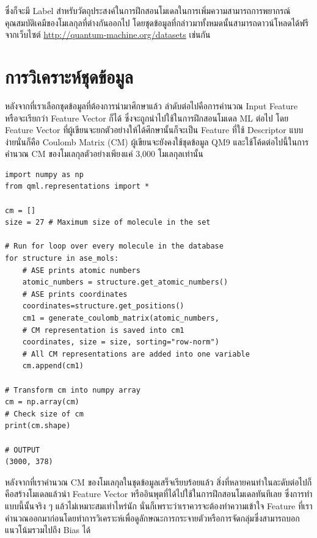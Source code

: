 \noindent ซึ่งก็จะมี Label สำหรับวัตถุประสงค์ในการฝึกสอนโมเดลในการเพิ่มความสามารถการพยากรณ์คุณสมบัติเคมีของโมเลกุลที่ต่างกันออกไป 
โดยชุดข้อมูลที่กล่าวมาทั้งหมดนั้นสามารถดาวน์โหลดได้ฟรีจากเว็บไซต์ \url{http://quantum-machine.org/datasets} เช่นกัน

\section{การวิเคราะห์ชุดข้อมูล}
\label{sec:dataset_analysis}

หลังจากที่เราเลือกชุดข้อมูลที่ต้องการนำมาศึกษาแล้ว ลำดับต่อไปคือการคำนวณ Input Feature หรือจะเรียกว่า Feature Vector ก็ได้
ซึ่งจะถูกนำไปใช้ในการฝึกสอนโมเดล ML ต่อไป โดย Feature Vector ที่ผู้เขียนจะยกตัวอย่างให้ได้ศึกษานั้นก็จะเป็น Feature ที่ใช้ Descriptor 
แบบง่ายนั่นก็คือ Coulomb Matrix (CM) ผู้เขียนจะยังคงใช้ชุดข้อมูล QM9 และใช้โค้ดต่อไปนี้ในการคำนวณ CM ของโมเลกุลตัวอย่างเพียงแค่ 3,000 
โมเลกุลเท่านั้น

\begin{lstlisting}[style=MyPython]
import numpy as np
from qml.representations import * 

cm = []
size = 27 # Maximum size of molecule in the set

# Run for loop over every molecule in the database
for structure in ase_mols: 
    # ASE prints atomic numbers 
    atomic_numbers = structure.get_atomic_numbers() 
    # ASE prints coordinates
    coordinates=structure.get_positions() 
    cm1 = generate_coulomb_matrix(atomic_numbers,
    # CM representation is saved into cm1
    coordinates, size = size, sorting="row-norm") 
    # All CM representations are added into one variable
    cm.append(cm1) 

# Transform cm into numpy array
cm = np.array(cm) 
# Check size of cm
print(cm.shape)

# OUTPUT
(3000, 378)
\end{lstlisting}

หลังจากที่เราคำนวณ CM ของโมเลกุลในชุดข้อมูลเสร็จเรียบร้อยแล้ว สิ่งที่หลายคนทำในละดับต่อไปก็คือสร้างโมเดลแล้วนำ Feature Vector 
หรืออินพุตที่ได้ไปใช้ในการฝึกสอนโมเดลทันทีเลย ซึ่งการทำแบบนี้นั้นจริง ๆ แล้วไม่เหมาะสมเท่าไหร่นัก นั่นก็เพราะว่าเราควรจะต้องทำความเข้าใจ 
Feature ที่เราคำนวณออกมาก่อนโดยทำการวิเคราะห์เพื่อดูลักษณะการกระจายตัวหรือการจัดกลุ่มซึ่งสามารถบอกแนวโน้มรวมไปถึง Bias ได้

